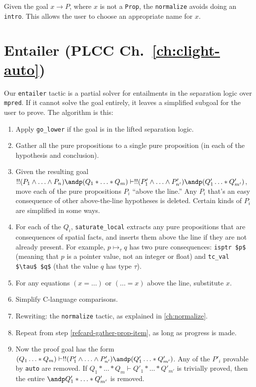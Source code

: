 \documentclass[12pt,fleqn,openany,oneside,showtrims]{memoir}
\newcommand{\ychapter}[2]{\chapter[#1]{#1 \hfill \normalsize #2}}
\begin{document}
Given the goal $x \rightarrow P$, where $x$ is not
a \lstinline{Prop}, the \lstinline{normalize} avoids
doing an \lstinline{intro}.  This allows the user
to choose an appropriate name for $x$.

\ychapter{Entailer}{(PLCC Ch.~\ref{ch:clight-auto})}
\label{refcard:entailer}
Our \lstinline{entailer} tactic is a partial solver
for entailments in the separation logic over \lstinline{mpred}.
If it cannot solve the goal entirely, it leaves a simplified
subgoal for the user to prove.  The algorithm is this:
\begin{enumerate}
\item Apply \lstinline{go_lower} if the goal is in the lifted
separation logic.
\item Gather all the pure propositions to a single pure proposition
\label{refcard-gather-prop-item}
(in each of the hypothesis and conclusion).
\item Given the resulting goal $!! (P_1 \wedge \ldots \wedge P_n) \andp (Q_1*\ldots*Q_m) \vdash !! (P'_1 \wedge \ldots \wedge P'_{n'}) \andp (Q'_1\ldots*Q'_{m'})$, 
move each of the pure propositions $P_i$ ``above the line.''  Any $P_i$ that's
an easy consequence of other above-the-line hypotheses is deleted.
Certain kinds of $P_i$ are simplified in some ways.
\item For each of the $Q_i$, \lstinline{saturate_local} extracts any
pure propositions that are consequences of spatial facts, and inserts
them above the line if they  are not already present.  For example,
$p \mapsto_\tau q$ has two pure consequences: \lstinline{isptr $p$}
(meaning that $p$ is a pointer value, not an integer or float)
and \lstinline{tc_val $\tau$ $q$} (that the value $q$ has type $\tau$).
\item For any equations $(x=\ldots)$ or $(\ldots=x)$ above the line,
substitute $x$.
\item Simplify C-language comparisons.
\item Rewriting: the \lstinline{normalize}
tactic, as explained in \autoref{ch:normalize}.
\item Repeat from step \ref{refcard-gather-prop-item}, as long as progress is made.
\item Now the proof goal has the form
$(Q_1\ldots*Q_m) \vdash !! (P'_1 \wedge \ldots \wedge P'_{n'}) \andp (Q'_1\ldots*Q'_{m'})$.
Any of the $P'_i$ provable by \lstinline{auto} are removed.
If $Q_1*\ldots*Q_m \vdash Q'_1*\ldots*Q'_{m'}$ is trivially
proved, then the entire $\andp Q'_1*\ldots*Q'_{m'}$ is removed.
\end{enumerate}
\end{document}
